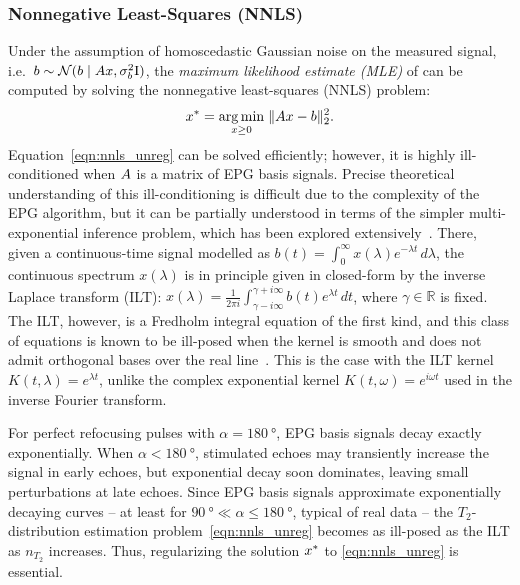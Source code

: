 \subsubsection{Nonnegative Least-Squares (\gls*{NNLS})}\label{subsubsec:nnls}

Under the assumption of homoscedastic Gaussian noise on the measured signal, i.e.\ $b \sim \mathcal{N}(b \mid A x, \sigma_{b}^2 \mathrm{I})$, the \textit{maximum likelihood estimate (\gls*{MLE})} of \distbn can be computed by solving the nonnegative least-squares (\gls*{NNLS}) problem:
\begin{align}\label{eqn:nnls_unreg}
    x^* = \underset{x \ge 0}{\operatorname{arg\,min}} \; \lVert A x - b \rVert_2^2.
\end{align}
Equation~\eqref{eqn:nnls_unreg} can be solved efficiently;
however, it is highly ill-conditioned when $A$ is a matrix of \gls*{EPG} basis signals.
Precise theoretical understanding of this ill-conditioning is difficult due to the complexity of the \gls*{EPG} algorithm, but it can be partially understood in terms of the simpler multi-exponential inference problem, which has been explored extensively~\citep{istratov_exponential_1999}.
There, given a continuous-time signal modelled as $b(t) = \int_{0}^{\infty} x(\lambda) e^{-\lambda t} \, d\lambda$, the continuous spectrum $x(\lambda)$ is in principle given in closed-form by the inverse Laplace transform (\gls*{ILT}): $x(\lambda) = \frac{1}{2\pi i} \int_{\gamma-i\infty}^{\gamma+i\infty}b(t)e^{\lambda t}\, dt$, where $\gamma\in\mathbb{R}$ is fixed.
The \gls*{ILT}, however, is a Fredholm integral equation of the first kind, and this class of equations is known to be ill-posed when the kernel is smooth and does not admit orthogonal bases over the real line~\citep{istratov_exponential_1999}.
This is the case with the \gls*{ILT} kernel $K(t,\lambda) = e^{\lambda t}$, unlike the complex exponential kernel $K(t,\omega) = e^{i\omega t}$ used in the inverse Fourier transform.

For perfect refocusing pulses with $\alpha = \SI{180}{\degree}$, \gls*{EPG} basis signals decay exactly exponentially.
When $\alpha < \SI{180}{\degree}$, stimulated echoes may transiently increase the signal in early echoes, but exponential decay soon dominates, leaving small perturbations at late echoes.
Since \gls*{EPG} basis signals approximate exponentially decaying curves -- at least for $\SI{90}{\degree} \ll \alpha \le \SI{180}{\degree}$, typical of real data -- the $T_2$-distribution estimation problem~\eqref{eqn:nnls_unreg} becomes as ill-posed as the \gls*{ILT} as $n_{T_2}$ increases.
Thus, regularizing the solution $x^*$ to \eqref{eqn:nnls_unreg} is essential.

